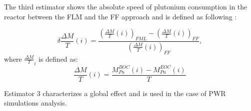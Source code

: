 The third estimator shows the absolute speed of plutonium consumption in the
reactor between the \gls{FLM} and the \gls{FF} approach and is defined as
following :

\begin{equation}
    \delta{\frac{\Delta M}{T}}(i) =
        \frac{\left(\frac{\Delta M}{T}(i)\right)_{FML}
              - \left(\frac{\Delta M}{T}(i)\right)_{FF}}
             {\left(\frac{\Delta M}{T}(i)\right)_{FF}},
\end{equation}
where $\frac{\Delta M}{T}_{i}$ is defined as:
\begin{equation}
    \frac{\Delta M}{T}(i) = \frac{M_{Pu}^{BOC}(i) -
    M_{Pu}^{EOC}(i)}{T}
\end{equation}

Estimator 3 characterizes a global effect and is used in the case of \gls{PWR}
simulations analysis.

